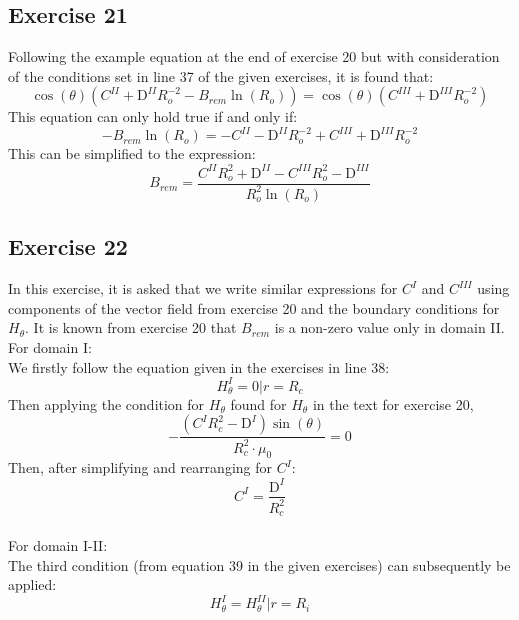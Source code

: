 \documentclass{article}
\begin{document}
\subsection{Exercise 21}
Following the example equation at the end of exercise 20 but with consideration of the conditions set in line 37 of the given exercises, it is found that:
\begin{equation}
    \cos\left(\theta\right)\left(C^{\mathit{II}}+\mathrm{D}^{\mathit{II}}R_{o}^{-2}-B_{\mathit{rem}}\ln\left(R_{o}\right)\right)=\cos\left(\theta\right)\left(C^{\mathit{III}}+\mathrm{D}^{\mathit{III}}R_{o}^{-2}\right)
\end{equation}
This equation can only hold true if and only if:
\begin{equation}
    -B_{\mathit{rem}}\ln\left(R_{o}\right)=-C^{\mathit{II}}-\mathrm{D}^{\mathit{II}}R_{o}^{-2}+C^{\mathit{III}}+\mathrm{D}^{\mathit{III}}R_{o}^{-2}
\end{equation}
This can be simplified to the expression:
\begin{equation}
    B_{\mathit{rem}}=\frac{C^{\mathit{II}}R_{o}^{2}+\mathrm{D}^{\mathit{II}}-C^{\mathit{III}}R_{o}^{2}-\mathrm{D}^{\mathit{III}}}{R_{o}^{2}\ln\left(R_{o}\right)}
\end{equation}
\subsection{Exercise 22}
In this exercise, it is asked that we write similar expressions for $C^I$ and $C^{III}$ using components of the vector field from exercise 20 and the boundary conditions for $H_\theta$. It is known from exercise 20 that $B_{rem}$ is a non-zero value only in domain II. 
\\
For domain I:
\\
We firstly follow the equation given in the exercises in line 38:
\begin{equation}
    H_{\theta}^{I}=0|r=R_{c}
\end{equation}
Then applying the condition for $H_\theta$ found for $H_\theta$ in the text for exercise 20,
\begin{equation}
    -\frac{\left(C^{{I}}R_{c}^{2}-\mathrm{D}^{I}\right)\sin\left(\theta\right)}{R_{c}^{2}\cdot \mu_{0}}=0
\end{equation}
Then, after simplifying and rearranging for $C^I$:
\begin{equation}
    C^{I}=\frac{\mathrm{D}^{I}}{R_{c}^{2}}
\end{equation}
\\
For domain I-II:
\\
The third condition (from equation 39 in the given exercises) can subsequently be applied:
\begin{equation}
    H_{\theta}^{I}=H_{\theta}^{\mathit{II}}|r=R_{i}
\end{equation}
\end{document}
